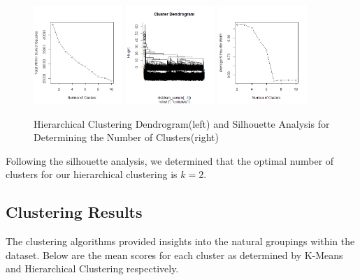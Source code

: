 \documentclass[8pt]{report}
\begin{document}
\begin{figure}[H]
    \centering
    \includegraphics[width=0.3\textwidth]{unsupervised_figures/elbow_method_pca.png}
    \includegraphics[width=0.3\textwidth]{unsupervised_figures/hclust_pca.png}
    \includegraphics[width=0.3\textwidth]{unsupervised_figures/silhouette_method.png}
    \caption{Hierarchical Clustering Dendrogram(left) and Silhouette Analysis for Determining the Number of Clusters(right)}
    \label{fig:silhouette_analysis}
\end{figure}

Following the silhouette analysis, we determined that the optimal number of clusters for our hierarchical clustering is \( k = 2 \). 

\subsection{Clustering Results}

The clustering algorithms provided insights into the natural groupings within the dataset. Below are the mean scores for each cluster as determined by K-Means and Hierarchical Clustering respectively.
\end{document}
